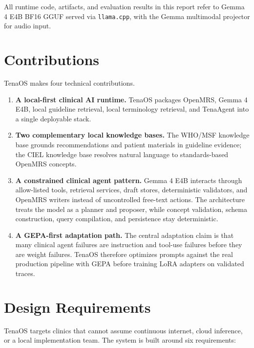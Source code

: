 \documentclass[11pt]{article}
\newcommand{\Product}{TenaOS}
\newcommand{\Gemma}{Gemma 4 E4B}
\newcommand{\OpenMRS}{OpenMRS}
\newcommand{\CIEL}{CIEL}
\newcommand{\WHO}{WHO/MSF}
\begin{document}
All runtime code, artifacts, and evaluation results in this report refer to \Gemma{} BF16 GGUF served via \texttt{llama.cpp}, with the Gemma multimodal projector for audio input.

\section{Contributions}

\Product{} makes four technical contributions.

\begin{enumerate}
  \item \textbf{A local-first clinical AI runtime.} \Product{} packages \OpenMRS{}, \Gemma{}, local guideline retrieval, local terminology retrieval, and TenaAgent into a single deployable stack.
  \item \textbf{Two complementary local knowledge bases.} The \WHO{} knowledge base grounds recommendations and patient materials in guideline evidence; the \CIEL{} knowledge base resolves natural language to standards-based \OpenMRS{} concepts.
  \item \textbf{A constrained clinical agent pattern.} \Gemma{} interacts through allow-listed tools, retrieval services, draft stores, deterministic validators, and \OpenMRS{} writers instead of uncontrolled free-text actions. The architecture treats the model as a planner and proposer, while concept validation, schema construction, query compilation, and persistence stay deterministic.
  \item \textbf{A GEPA-first adaptation path.} The central adaptation claim is that many clinical agent failures are instruction and tool-use failures before they are weight failures. \Product{} therefore optimizes prompts against the real production pipeline with GEPA before training LoRA adapters on validated traces.
\end{enumerate}

\section{Design Requirements}

\Product{} targets clinics that cannot assume continuous internet, cloud inference, or a local implementation team. The system is built around six requirements:
\end{document}
